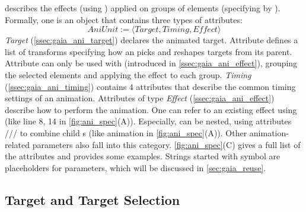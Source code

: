\aniunit{} describes the effects (using ) applied on groups of elements (specifying by ). 
Formally, one \aniunit{} is an object that contains three types of attributes:
$$
AniUnit := \langle Target, Timing, Effect \rangle
$$
\textit{Target} (\autoref{ssec:gaia_ani_target}) declares the animated target.
Attribute  defines a list of transforms specifying how an \aniunit{} picks and reshapes targets from its parent.
Attribute  can only be used with  (introduced in \autoref{ssec:gaia_ani_effect}), grouping the selected elements and applying the effect to each group.
\textit{Timing} (\autoref{ssec:gaia_ani_timing}) contains 4 attributes that describe the common timing settings of an animation.
Attributes of type \textit{Effect} (\autoref{ssec:gaia_ani_effect}) describe how to perform the animation.
One \aniunit{} can refer to an existing effect using  (like line 8, 14 in \autoref{fig:ani_spec}(A)).
Especially, \aniunit{} can be nested, using attributes /// to combine child \aniunit{}s (like  animation in \autoref{fig:ani_spec}(A)).
Other animation-related parameters also fall into this category.
\autoref{fig:ani_spec}(C) gives a full list of the attributes and provides some examples.
Strings started with symbol \code{\$} are placeholders for parameters, which will be discussed in \autoref{sec:gaia_reuse}.


\subsection{Target and Target Selection}
\label{ssec:gaia_ani_target}


